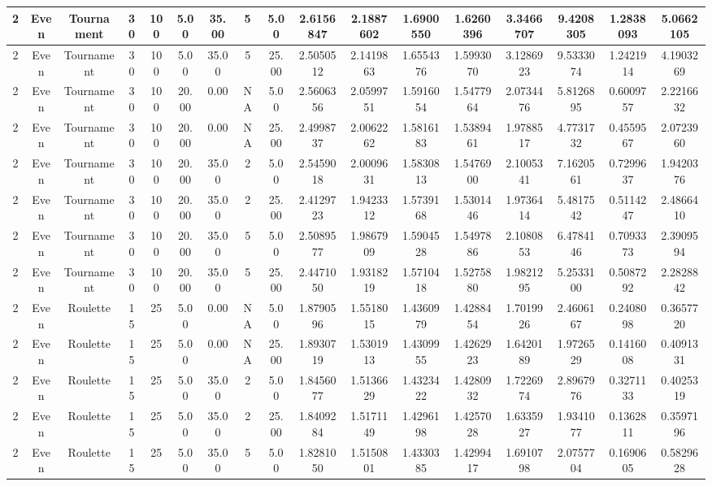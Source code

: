 \begin{longtable}{ | c | c | c | c | c | c | c | c | c | c | c | c | c | c | c | c | c | }
	\hline
	2	&	Even	&	Tournament	&	30	&	100	&	5.00	&	35.00	&	5	&	5.00	&	2.6156847	&	2.1887602	&	1.6900550	&	1.6260396	&	3.3466707	&	9.4208305	&	1.2838093	&	5.0662105 \\
	\hline
	2	&	Even	&	Tournament	&	30	&	100	&	5.00	&	35.00	&	5	&	25.00	&	2.5050512	&	2.1419863	&	1.6554376	&	1.5993070	&	3.1286923	&	9.5333074	&	1.2421914	&	4.1903269 \\
	\hline
	2	&	Even	&	Tournament	&	30	&	100	&	20.00	&	0.00	&	NA	&	5.00	&	2.5606356	&	2.0599751	&	1.5916054	&	1.5477964	&	2.0734476	&	5.8126895	&	0.6009757	&	2.2216632 \\
	\hline
	2	&	Even	&	Tournament	&	30	&	100	&	20.00	&	0.00	&	NA	&	25.00	&	2.4998737	&	2.0062262	&	1.5816183	&	1.5389461	&	1.9788517	&	4.7731732	&	0.4559567	&	2.0723960 \\
	\hline
	2	&	Even	&	Tournament	&	30	&	100	&	20.00	&	35.00	&	2	&	5.00	&	2.5459018	&	2.0009631	&	1.5830813	&	1.5476900	&	2.1005341	&	7.1620561	&	0.7299637	&	1.9420376 \\
	\hline
	2	&	Even	&	Tournament	&	30	&	100	&	20.00	&	35.00	&	2	&	25.00	&	2.4129723	&	1.9423312	&	1.5739168	&	1.5301446	&	1.9736414	&	5.4817542	&	0.5114247	&	2.4866410 \\
	\hline
	2	&	Even	&	Tournament	&	30	&	100	&	20.00	&	35.00	&	5	&	5.00	&	2.5089577	&	1.9867909	&	1.5904528	&	1.5497886	&	2.1080853	&	6.4784146	&	0.7093373	&	2.3909594 \\
	\hline
	2	&	Even	&	Tournament	&	30	&	100	&	20.00	&	35.00	&	5	&	25.00	&	2.4471050	&	1.9318219	&	1.5710418	&	1.5275880	&	1.9821295	&	5.2533100	&	0.5087292	&	2.2828842 \\
	\hline
	2	&	Even	&	Roulette	&	15	&	25	&	5.00	&	0.00	&	NA	&	5.00	&	1.8790596	&	1.5518015	&	1.4360979	&	1.4288454	&	1.7019926	&	2.4606167	&	0.2408098	&	0.3657720 \\
	\hline
	2	&	Even	&	Roulette	&	15	&	25	&	5.00	&	0.00	&	NA	&	25.00	&	1.8930719	&	1.5301913	&	1.4309955	&	1.4262923	&	1.6420189	&	1.9726529	&	0.1416008	&	0.4091331 \\
	\hline
	2	&	Even	&	Roulette	&	15	&	25	&	5.00	&	35.00	&	2	&	5.00	&	1.8456077	&	1.5136629	&	1.4323422	&	1.4280932	&	1.7226974	&	2.8967976	&	0.3271133	&	0.4025319 \\
	\hline
	2	&	Even	&	Roulette	&	15	&	25	&	5.00	&	35.00	&	2	&	25.00	&	1.8409284	&	1.5171149	&	1.4296198	&	1.4257028	&	1.6335927	&	1.9341077	&	0.1362811	&	0.3597196 \\
	\hline
	2	&	Even	&	Roulette	&	15	&	25	&	5.00	&	35.00	&	5	&	5.00	&	1.8281050	&	1.5150801	&	1.4330385	&	1.4299417	&	1.6910798	&	2.0757704	&	0.1690605	&	0.5829628 \\

\end{longtable}
